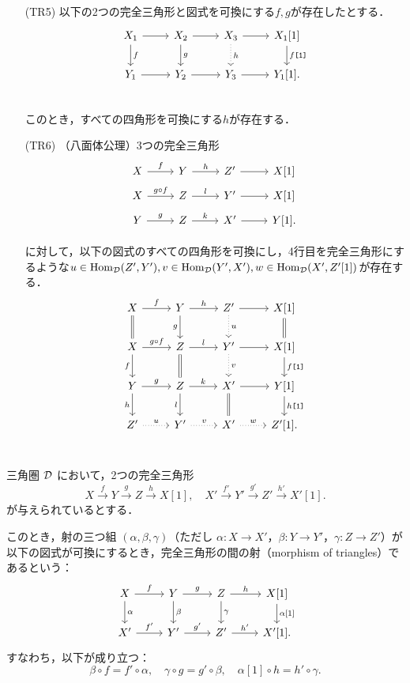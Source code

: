\begin{defn}
\begin{itemize}
	\item[(TR5)]
以下の2つの完全三角形と図式を可換にする$f,g$が存在したとする．
		\[
		\begin{tikzcd}
			X_1\ar[r]\ar[d,"f"]& X_2\ar[r]\ar[d,"g"]& X_3\ar[r]\ar[d,"h",dotted] & X_1[1]\ar[d,"f\texttt{[1]}"]\\
			Y_1\ar[r]& Y_2\ar[r]& Y_3\ar[r] & Y_1[1].\\
		\end{tikzcd}
	\]
	このとき，すべての四角形を可換にする$h$が存在する．

	\item[(TR6)]
		（八面体公理）3つの完全三角形
			\[
				\begin{tikzcd}[row sep=5pt]
			X \ar[r,"f"]& Y\ar[r,"h"]& Z' \ar[r]& X[1]\\
			X \ar[r,"g\circ f"]& Z\ar[r,"l"]& Y' \ar[r]& X[1]\\
			Y \ar[r,"g"]& Z\ar[r,"k"]& X' \ar[r]& Y[1].\\
		\end{tikzcd}
			\]
			に対して，以下の図式のすべての四角形を可換にし，4行目を完全三角形にするような$u\in\operatorname{\mathrm{Hom}}_{{\mathcal D}}(Z',Y'),v\in\operatorname{\mathrm{Hom}}_{{\mathcal D}}(Y',X'),w\in\operatorname{\mathrm{Hom}}_{{\mathcal D}}(X',Z'[1])$が存在する．
			\[
		\begin{tikzcd}
			X \ar[r,"f"]\ar[d,equal]& Y\ar[r,"h"]\ar[d,"g",swap]& Z'\ar[d,"u",dotted] \ar[r]& X[1]\ar[d,equal]\\
			X \ar[r,"g\circ f"]\ar[d,"f",swap]& Z\ar[r,"l"]\ar[d,equal]& Y'\ar[d,"v",dotted] \ar[r]& X[1]\ar[d,"f\texttt{[1]}"]\\
			Y \ar[r,"g"]\ar[d,"h",swap]& Z\ar[r,"k"]\ar[d,"l",swap]& X' \ar[r]\ar[d,equal]& Y[1]\ar[d,"h\texttt{[1]}"]\\
			Z' \ar[r,"u",dotted]& Y'\ar[r,"v",dotted]& X' \ar[r,"w",dotted]& Z'[1].\\
		\end{tikzcd}
			\]
	\end{itemize}
\end{defn}

\begin{defn}\cite[p.243]{KS06}
三角圏 ${\mathcal D}$ において，2つの完全三角形
\[
X \xrightarrow{f} Y \xrightarrow{g} Z \xrightarrow{h} X[1], \quad
X' \xrightarrow{f'} Y' \xrightarrow{g'} Z' \xrightarrow{h'} X'[1].
\]
が与えられているとする．

このとき，射の三つ組 $(\alpha, \beta, \gamma)$（ただし $\alpha \colon X \to X'$，$\beta \colon Y \to Y'$，$\gamma \colon Z \to Z'$）が以下の図式が可換にするとき，完全三角形の間の射（morphism of triangles）であるという：
\[
\begin{tikzcd}
X \arrow{r}{f} \arrow{d}{\alpha} & Y \arrow{r}{g} \arrow{d}{\beta} & Z \arrow{r}{h} \arrow{d}{\gamma} & X[1] \arrow{d}{\alpha[1]} \\
X' \arrow{r}{f'} & Y' \arrow{r}{g'} & Z' \arrow{r}{h'} & X'[1].
\end{tikzcd}
\]
すなわち，以下が成り立つ：
\[
\beta \circ f = f' \circ \alpha, \quad
\gamma \circ g = g' \circ \beta, \quad
\alpha[1] \circ h = h' \circ \gamma.
\]
\end{defn}
